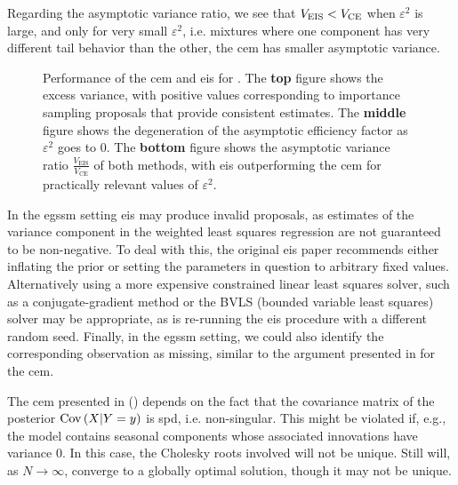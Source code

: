 \begin{example}
  Regarding the asymptotic variance ratio, we see that $V_{{\text{EIS}}} < V_{{\text{CE}}}$ when $\varepsilon^{2}$ is large, and only for very small $\varepsilon^{2}$, i.e. mixtures where one component has very different tail behavior than the other, the \gls{cem} has smaller asymptotic variance. 
    \begin{figure}
        \centering

        \resizebox{\textwidth}{!}{%
        }
        \caption{Performance of the \gls{cem} and \gls{eis} for . The \textbf{top} figure shows the excess variance, with positive values corresponding to importance sampling proposals that provide consistent estimates. The \textbf{middle} figure shows the degeneration of the asymptotic efficiency factor as $\varepsilon^{2}$ goes to $0$. The \textbf{bottom} figure shows the asymptotic variance ratio $\frac{V_{\text{EIS}}}{V_{\text{CE}}}$ of both methods, with \gls{eis} outperforming the \gls{cem} for practically relevant values of $\varepsilon^{2}$.}
        \label{fig:gsmm_eps}
    \end{figure}
\end{example}
\vspace{15pt}
In the \gls{egssm} setting \gls{eis} may produce invalid proposals, as estimates of the variance component in the weighted least squares regression are not guaranteed to be non-negative. To deal with this, the original \gls{eis} paper \citep[Section 3.2]{Richard2007Efficient} recommends either inflating the prior or setting the parameters in question to arbitrary fixed values. Alternatively using a more expensive constrained linear least squares solver, such as a conjugate-gradient method \citep{Branch1999Subspace} or the BVLS (bounded variable least squares) solver \citep{Stark1995Boundedvariable} may be appropriate, as is re-running the \gls{eis} procedure with a different random seed. Finally, in the \gls{egssm} setting, we could also identify the corresponding observation as missing, similar to the argument presented in  for the \gls{cem}. 

The \gls{cem} presented in  () depends on the fact that the covariance matrix of the posterior $\operatorname{Cov} \left( X | Y = y \right)$ is \gls{spd}, i.e. non-singular. This might be violated if, e.g., the model contains seasonal components whose associated innovations have variance $0$. In this case, the Cholesky roots involved will not be unique. Still  will, as $N\to\infty$, converge to a globally optimal solution, though it may not be unique. 


